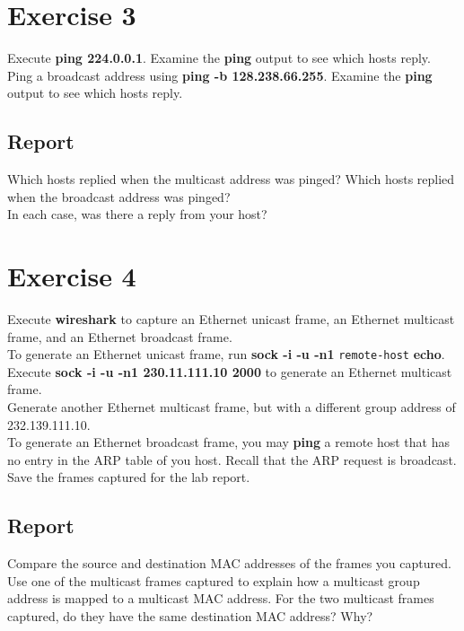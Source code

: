 \documentclass[10pt,a4paper]{article}
\numberwithin{equation}{section}
\numberwithin{figure}{section}
\numberwithin{table}{section}
\begin{document}
    \section{ Exercise 3}
    Execute \textbf{ping 224.0.0.1}.
    Examine the \textbf{ping} output to see which hosts reply. \\
    Ping a broadcast address using \textbf{ping -b 128.238.66.255}.
    Examine the \textbf{ping} output to see which hosts reply. \\
    \subsection*{Report}
    Which hosts replied when the multicast address was pinged?
    Which hosts replied when the broadcast address was pinged? \\
    In each case, was there a reply from your host?


    \section{ Exercise 4}
    Execute \textbf{wireshark} to capture an Ethernet unicast frame, an Ethernet multicast frame, and an Ethernet broadcast frame. \\
    To generate an Ethernet unicast frame, run \textbf{sock -i -u -n1} \texttt{remote-host} \textbf{echo}. \\
    Execute \textbf{sock -i -u -n1 230.11.111.10 2000} to generate an Ethernet multicast frame. \\
    Generate another Ethernet multicast frame, but with a different group address of 232.139.111.10. \\
    To generate an Ethernet broadcast frame, you may \textbf{ping} a remote host that has no entry in the ARP table of you host.
    Recall that the ARP request is broadcast. \\
    Save the frames captured for the lab report.
    \subsection*{Report}
    Compare the source and destination MAC addresses of the frames you captured. \\
    Use one of the multicast frames captured to explain how a multicast group address is mapped to a multicast MAC address.
    For the two multicast frames captured, do they have the same destination MAC address?
    Why?
\end{document}

